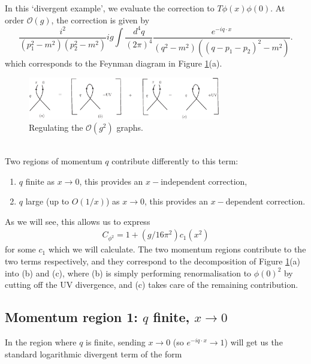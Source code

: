 \documentclass{article}
\begin{document}
In this `divergent example', we evaluate the correction to $T\phi(x)\phi(0)$. At order $\mathcal{O}(g)$, the correction is given by
\begin{equation}
    \frac{i^2}{(p_1^2-m^2)(p_2^2-m^2)}ig\int \frac{d^4q}{(2\pi)^4} \frac{e^{-iq\cdot x}}{(q^2-m^2)((q-p_1-p_2)^2 - m^2)}.
    \label{loopOg}
\end{equation}
which corresponds to the Feynman diagram in Figure \ref{fig:10.1.3abc}(a).\\

\begin{figure}[H]
\centering
\includegraphics[width=0.75\textwidth]{Graphs/Fig1013abc.eps}
\caption{Regulating the $\mathcal{O}(g^2)$ graphs.}
\label{fig:10.1.3abc}
\end{figure}\\

Two regions of momentum $q$ contribute differently to this term:
\begin{enumerate}
    \item $q$ finite as $x \rightarrow 0$, this  provides an $x-$independent correction,
    \item $q$ large (up to $O(1/x)$) as $x \rightarrow 0$, this  provides an $x-$dependent correction.
\end{enumerate}
As we will see, this allows us to express 
\begin{align}
    C_{\phi^2} = 1 + (g/16\pi^2)c_1(x^2)
\end{align}
for some $c_1$ which we will calculate. The two momentum regions contribute to the two terms respectively, and they correspond to the decomposition of Figure \ref{fig:10.1.3abc}(a) into (b) and (c), where (b) is simply performing renormalisation to $\phi(0)^2$ by cutting off the UV divergence, and (c) takes care of the remaining contribution. 
\subsection{Momentum region 1: $q$ finite, $x\rightarrow 0$}

In the region where $q$ is finite, sending $x\rightarrow 0$ (so $e^{-iq\cdot x} \rightarrow 1$) will get  us the standard logarithmic divergent term of the form 
\end{document}
